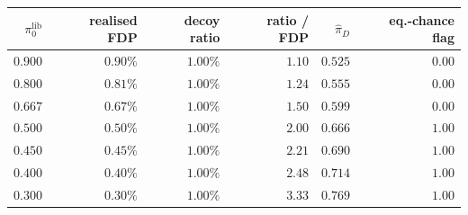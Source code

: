 \begin{tabular}{rrrrrr}
\toprule
$\pi_0^{\mathrm{lib}}$ & realised FDP & decoy ratio & ratio / FDP & $\widehat\pi_D$ & eq.-chance flag \\
\midrule
$0.900$ & $0.90\%$ & $1.00\%$ & $1.10$ & $0.525$ & $0.00$ \\
$0.800$ & $0.81\%$ & $1.00\%$ & $1.24$ & $0.555$ & $0.00$ \\
$0.667$ & $0.67\%$ & $1.00\%$ & $1.50$ & $0.599$ & $0.00$ \\
$0.500$ & $0.50\%$ & $1.00\%$ & $2.00$ & $0.666$ & $1.00$ \\
$0.450$ & $0.45\%$ & $1.00\%$ & $2.21$ & $0.690$ & $1.00$ \\
$0.400$ & $0.40\%$ & $1.00\%$ & $2.48$ & $0.714$ & $1.00$ \\
$0.300$ & $0.30\%$ & $1.00\%$ & $3.33$ & $0.769$ & $1.00$ \\
\bottomrule
\end{tabular}
